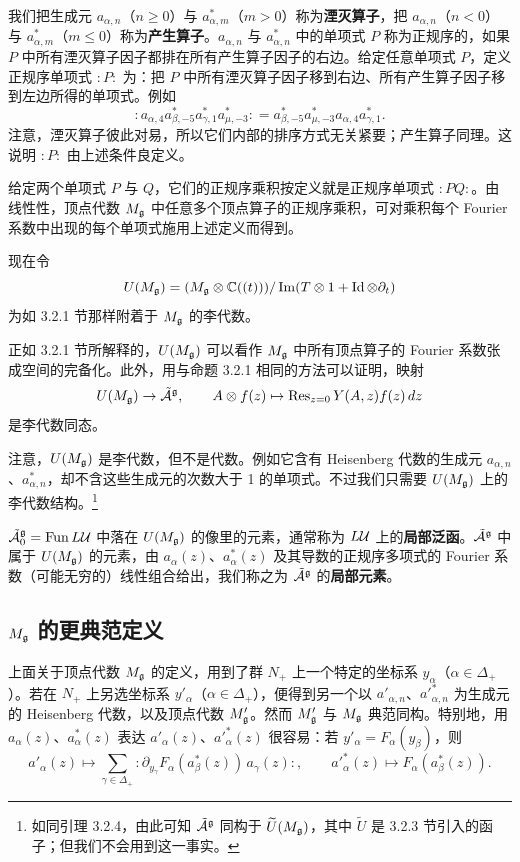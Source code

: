 我们把生成元 $a_{\alpha,n}$（$n\ge 0$）与 $a^*_{\alpha,m}$（$m>0$）称为\textbf{湮灭算子}，把 $a_{\alpha,n}$（$n<0$）与 $a^*_{\alpha,m}$（$m\le 0$）称为\textbf{产生算子}。$a_{\alpha,n}$ 与 $a^*_{\alpha,n}$ 中的单项式 $P$ 称为正规序的，如果 $P$ 中所有湮灭算子因子都排在所有产生算子因子的右边。给定任意单项式 $P$，定义正规序单项式 ${:}P{:}$ 为：把 $P$ 中所有湮灭算子因子移到右边、所有产生算子因子移到左边所得的单项式。例如
\[
{:}a_{\alpha,4}a^*_{\beta,-5}a^*_{\gamma,1}a^*_{\mu,-3}{:} = a^*_{\beta,-5}a^*_{\mu,-3}a_{\alpha,4}a^*_{\gamma,1}.
\]
注意，湮灭算子彼此对易，所以它们内部的排序方式无关紧要；产生算子同理。这说明 ${:}P{:}$ 由上述条件良定义。

给定两个单项式 $P$ 与 $Q$，它们的正规序乘积按定义就是正规序单项式 ${:}PQ{:}$。由线性性，顶点代数 $M_{\mathfrak{g}}$ 中任意多个顶点算子的正规序乘积，可对乘积每个 Fourier 系数中出现的每个单项式施用上述定义而得到。

现在令
\[
U(M_{\mathfrak{g}}) = (M_{\mathfrak{g}}\otimes \mathbb{C}((t)))/\operatorname{Im}(T\otimes 1 + \operatorname{Id}\otimes\partial_t)
\]
为如 3.2.1 节那样附着于 $M_{\mathfrak{g}}$ 的李代数。

正如 3.2.1 节所解释的，$U(M_{\mathfrak{g}})$ 可以看作 $M_{\mathfrak{g}}$ 中所有顶点算子的 Fourier 系数张成空间的完备化。此外，用与命题 3.2.1 相同的方法可以证明，映射
\[
U(M_{\mathfrak{g}}) \to \tilde{\mathcal{A}}^{\mathfrak{g}},\qquad A\otimes f(z)\mapsto \operatorname{Res}_{z=0}Y(A,z)f(z)\,dz
\]
是李代数同态。

注意，$U(M_{\mathfrak{g}})$ 是李代数，但不是代数。例如它含有 Heisenberg 代数的生成元 $a_{\alpha,n}$、$a^*_{\alpha,n}$，却不含这些生成元的次数大于 1 的单项式。不过我们只需要 $U(M_{\mathfrak{g}})$ 上的李代数结构。\footnote{如同引理 3.2.4，由此可知 $\tilde{\mathcal{A}}^{\mathfrak{g}}$ 同构于 $\widetilde{U}(M_{\mathfrak{g}})$，其中 $\widetilde{U}$ 是 3.2.3 节引入的函子；但我们不会用到这一事实。}

$\tilde{\mathcal{A}}^{\mathfrak{g}}_0 = \operatorname{Fun} L\mathcal{U}$ 中落在 $U(M_{\mathfrak{g}})$ 的像里的元素，通常称为 $L\mathcal{U}$ 上的\textbf{局部泛函}。$\tilde{\mathcal{A}}^{\mathfrak{g}}$ 中属于 $U(M_{\mathfrak{g}})$ 的元素，由 $a_\alpha(z)$、$a^*_\alpha(z)$ 及其导数的正规序多项式的 Fourier 系数（可能无穷的）线性组合给出，我们称之为 $\tilde{\mathcal{A}}^{\mathfrak{g}}$ 的\textbf{局部元素}。

\subsection{$M_{\mathfrak{g}}$ 的更典范定义}

上面关于顶点代数 $M_{\mathfrak{g}}$ 的定义，用到了群 $N_+$ 上一个特定的坐标系 $y_\alpha$（$\alpha\in\Delta_+$）。若在 $N_+$ 上另选坐标系 $y'_\alpha$（$\alpha\in\Delta_+$），便得到另一个以 $a'_{\alpha,n}$、$a'^*_{\alpha,n}$ 为生成元的 Heisenberg 代数，以及顶点代数 $M'_{\mathfrak{g}}$。然而 $M'_{\mathfrak{g}}$ 与 $M_{\mathfrak{g}}$ 典范同构。特别地，用 $a_\alpha(z)$、$a^*_\alpha(z)$ 表达 $a'_\alpha(z)$、$a'^*_\alpha(z)$ 很容易：若 $y'_\alpha = F_\alpha(y_\beta)$，则
\[
a'_\alpha(z) \mapsto \sum_{\gamma\in\Delta_+}{:}\partial_{y_\gamma}F_\alpha(a^*_\beta(z))\,a_\gamma(z){:},\qquad
a'^*_\alpha(z)\mapsto F_\alpha(a^*_\beta(z)).
\]


